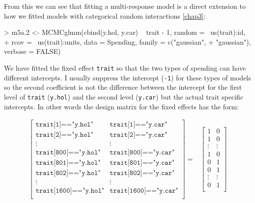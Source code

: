 \documentclass{article}
\begin{document}
From this we can see that fitting a multi-response model is a direct extension to how we fitted models with categorical random interactions \ref{chap3}:

\begin{Schunk}
\begin{Sinput}
> m5a.2 <- MCMCglmm(cbind(y.hol, y.car) ~ trait - 1, random = ~us(trait):id, 
+     rcov = ~us(trait):units, data = Spending, family = c("gaussian", 
+         "gaussian"), verbose = FALSE)
\end{Sinput}
\end{Schunk}

We have fitted the fixed effect \texttt{trait} so that the two types of spending can have different intercepts. I usually suppress the intercept (\texttt{-1}) for these types of models so the second coefficient is not the difference between the intercept for the first level of \texttt{trait} (\texttt{y.hol}) and the second level (\texttt{y.car}) but the actual trait specific intercepts. In other words the design matrix for the fixed effects has the form:

\begin{displaymath}
\begin{array}{rl}
\left[
\begin{array}{cc}
\texttt{trait[1]=="y.hol"}&\texttt{trait[1]=="y.car"}\\
\texttt{trait[2]=="y.hol"}&\texttt{trait[2]=="y.car"}\\
\vdots&\vdots\\
\texttt{trait[800]=="y.hol"}&\texttt{trait[800]=="y.car"}\\
\texttt{trait[801]=="y.hol"}&\texttt{trait[801]=="y.car"}\\
\texttt{trait[802]=="y.hol"}&\texttt{trait[802]=="y.car"}\\
\vdots&\vdots\\
\texttt{trait[1600]=="y.hol"}&\texttt{trait[1600]=="y.car"}\\
\end{array}
\right]
=&
\left[
\begin{array}{cc}
1&0\\
1&0\\
\vdots&\vdots\\
1&0\\
0&1\\
0&1\\
\vdots&\vdots\\
0&1\\
\end{array}
\right]\\
\end{array}
\end{displaymath}
\end{document}
